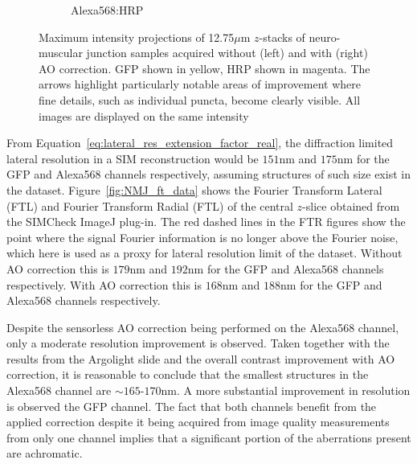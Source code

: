 \begin{figure}
\begin{subfigure}[t]{0.24\textwidth}
		\caption{Alexa568:HRP}
		\label{fig:DeepSIM_NMJ_AO_ROI2_Alexa568}
	\end{subfigure}
	\caption[\textit{Drosophila} neuro-muscular junction 
	data acquired on the DeepSIM imaging system]{Maximum intensity 
		projections of 12.75$\mu$m $z$-stacks of neuro-muscular junction 
		samples acquired without (left) and with (right) AO correction. GFP 
		shown in yellow, HRP shown in magenta. The arrows highlight 
		particularly notable areas of improvement where fine details, such as 
		individual puncta, become clearly visible. All images are displayed on the same intensity}
	\label{fig:DeepSIM_NMJ_data}
\end{figure}

From Equation~\ref{eq:lateral_res_extension_factor_real}, the diffraction 
limited lateral resolution in a SIM reconstruction would be $151$nm and 
$175$nm for the GFP and Alexa568 channels respectively, assuming structures 
of such size exist in the dataset. Figure~\ref{fig:NMJ_ft_data} shows the 
Fourier Transform Lateral (FTL) and Fourier Transform Radial (FTL) of the 
central $z$-slice obtained from the SIMCheck ImageJ 
plug-in\cite{ball2015simcheck}. The red dashed lines in the FTR figures 
show the point where the signal Fourier information is no longer above the 
Fourier noise, which here is used as a proxy for lateral resolution limit 
of the dataset. Without AO correction this is $179$nm and $192$nm for the GFP 
and Alexa568 channels respectively. With AO correction this is $168$nm and 
$188$nm for the GFP and Alexa568 channels respectively. 

Despite the sensorless AO correction being performed on the Alexa568 
channel, only a moderate resolution improvement is observed. Taken 
together with the results from the Argolight slide and the overall contrast 
improvement with AO correction, it is reasonable to conclude that the 
smallest structures in the Alexa568 channel are $\sim165$-$170$nm. A more 
substantial improvement in resolution is observed the GFP channel. The fact 
that both channels benefit from the applied correction despite it being 
acquired from image quality measurements from only one channel implies that 
a significant portion of the aberrations present are achromatic.

